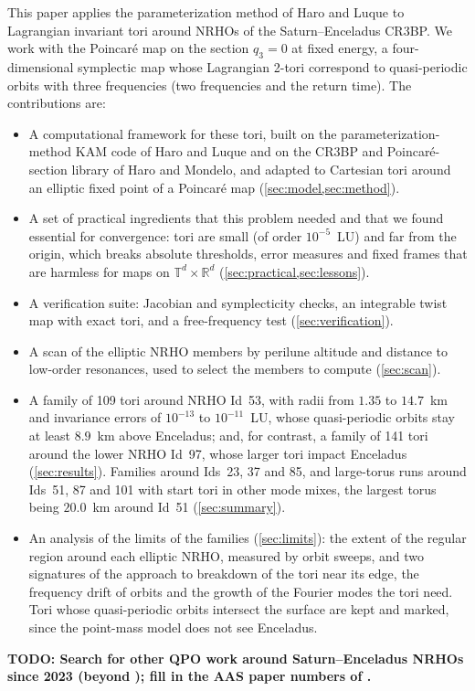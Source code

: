 \documentclass[11pt]{article}
\newcommand{\T}{\mathbb{T}}
\newcommand{\R}{\mathbb{R}}
\newcommand{\todo}[1]{\textbf{TODO: #1}}
\begin{document}
This paper applies the parameterization method of Haro and Luque
\cite{haroluque2016ch4,figueras2017rigorous} to Lagrangian invariant tori around NRHOs of the
Saturn--Enceladus CR3BP. We work with the Poincar\'e map on the section $q_3=0$ at fixed energy,
a four-dimensional symplectic map whose Lagrangian 2-tori correspond to quasi-periodic orbits
with three frequencies (two frequencies and the return time). The contributions are:
\begin{itemize}
\item A computational framework for these tori, built on the parameterization-method KAM code of
  Haro and Luque and on the CR3BP and Poincar\'e-section library of Haro and Mondelo, and adapted
  to Cartesian tori around an elliptic fixed point of a Poincar\'e map (\cref{sec:model,sec:method}).
\item A set of practical ingredients that this problem needed and that we found essential for
  convergence: tori are small (of order $10^{-5}$~LU) and far from the origin, which breaks
  absolute thresholds, error measures and fixed frames that are harmless for maps on
  $\T^d\times\R^d$ (\cref{sec:practical,sec:lessons}).
\item A verification suite: Jacobian and symplecticity checks, an integrable twist map with exact
  tori, and a free-frequency test (\cref{sec:verification}).
\item A scan of the elliptic NRHO members by perilune altitude and distance to low-order
  resonances, used to select the members to compute (\cref{sec:scan}).
\item A family of 109 tori around NRHO Id~53, with radii from $1.35$ to $14.7$~km and invariance
  errors of $10^{-13}$ to $10^{-11}$~LU, whose quasi-periodic orbits stay at least $8.9$~km above
  Enceladus; and, for contrast, a family of 141 tori around the lower NRHO Id~97, whose larger
  tori impact Enceladus (\cref{sec:results}). Families around Ids~23, 37 and 85, and large-torus
  runs around Ids~51, 87 and 101 with start tori in other mode mixes, the largest torus being
  $20.0$~km around Id~51 (\cref{sec:summary}).
\item An analysis of the limits of the families (\cref{sec:limits}): the extent of the regular
  region around each elliptic NRHO, measured by orbit sweeps, and two signatures of the approach
  to breakdown of the tori near its edge, the frequency drift of orbits and the growth of the
  Fourier modes the tori need. Tori whose quasi-periodic orbits intersect the surface are kept and
  marked, since the point-mass model does not see Enceladus.
\end{itemize}
\todo{Search for other QPO work around Saturn--Enceladus NRHOs since 2023 (beyond
\cite{blanchard2023qpo,blanchard2024thesis}); fill in the AAS paper numbers of
\cite{blanchard2023qpo,blanchard2023funnels}.}
\end{document}
